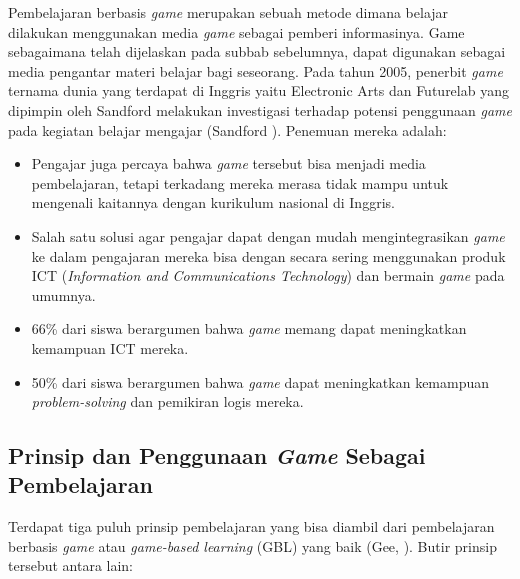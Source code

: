 	Pembelajaran berbasis \textit{game} merupakan sebuah metode dimana belajar dilakukan menggunakan media \textit{game} sebagai pemberi informasinya. Game sebagaimana telah dijelaskan pada subbab sebelumnya, dapat digunakan sebagai media pengantar materi belajar bagi seseorang. Pada tahun 2005, penerbit \textit{game} ternama dunia yang terdapat di Inggris yaitu Electronic Arts dan Futurelab yang dipimpin oleh Sandford melakukan investigasi terhadap potensi penggunaan \textit{game} pada kegiatan belajar mengajar (Sandford \citeyear{paper.futurelab}). Penemuan mereka adalah:
	\begin{itemize}
		\item Pengajar juga percaya bahwa \textit{game} tersebut bisa menjadi media pembelajaran, tetapi terkadang mereka merasa tidak mampu untuk mengenali kaitannya dengan kurikulum nasional di Inggris.
		\item Salah satu solusi agar pengajar dapat dengan mudah mengintegrasikan \textit{game} ke dalam pengajaran mereka bisa dengan secara sering menggunakan produk ICT (\textit{Information and Communications Technology}) dan bermain \textit{game} pada umumnya.
		\item 66\% dari siswa berargumen bahwa \textit{game} memang dapat meningkatkan kemampuan ICT mereka.
		\item 50\% dari siswa berargumen bahwa \textit{game} dapat meningkatkan kemampuan \textit{problem-solving} dan pemikiran logis mereka.
	\end{itemize}
	
	\subsection{Prinsip dan Penggunaan \textit{Game} Sebagai Pembelajaran}
	
	Terdapat tiga puluh prinsip pembelajaran yang bisa diambil dari pembelajaran berbasis \textit{game} atau \textit{game-based learning} (GBL) yang baik (Gee, \citeyear{papper.jpgee}). Butir prinsip tersebut antara lain:
	
